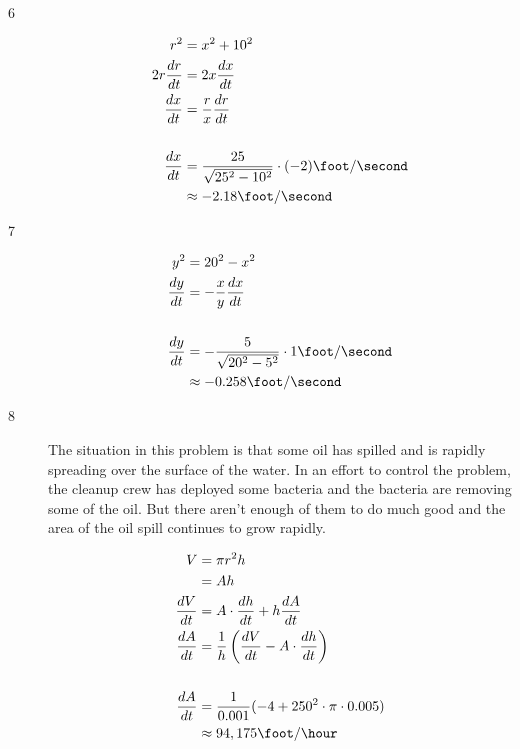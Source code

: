 \documentclass[fleqn]{exam}
\begin{document}
\begin{description}
\item[6]
\begin{align*}
  r^2 &= x^2 + 10^2 \\
  2 r \frac{dr}{dt} &= 2x \frac{dx}{dt} \\
  \frac{dx}{dt} &= \frac{r}{x} \frac{dr}{dt} \\
  \\
  \frac{dx}{dt} &= \frac{25}{\sqrt{25^2 - 10^2}} \cdot (-2) \foot / \second \\
  &\approx -2.18 \foot / \second \\
\end{align*}

\item[7]
\begin{align*}
  y^2 &= 20^2 - x^2 \\
  \frac{dy}{dt} &= -\frac{x}{y} \frac{dx}{dt} \\
  \\
  \frac{dy}{dt} &= -\frac{5}{\sqrt{20^2 - 5^2}} \cdot 1 \foot / \second \\
  &\approx - 0.258 \foot / \second \\
\end{align*}

\item[8]
The situation in this problem is that some oil has spilled and is rapidly spreading over the surface of the water.  In
an effort to control the problem, the cleanup crew has deployed some bacteria and the bacteria are removing some of the
oil.  But there aren't enough of them to do much good and the area of the oil spill continues to grow rapidly.

\begin{align*}
  V &= \pi r^2 h \\
    &= Ah \\ 
  \frac{dV}{dt} &= A \cdot \frac{dh}{dt} + h \frac{dA}{dt} \\
  \frac{dA}{dt} &= \frac{1}{h} \left( \frac{dV}{dt} - A \cdot \frac{dh}{dt} \right) \\
  \\
  \frac{dA}{dt} &= \frac{1}{0.001} ( -4 + 250^2 \cdot \pi \cdot 0.005) \\
                &\approx 94,175 \foot / \hour \\
\end{align*}


\end{description}
\end{document}
